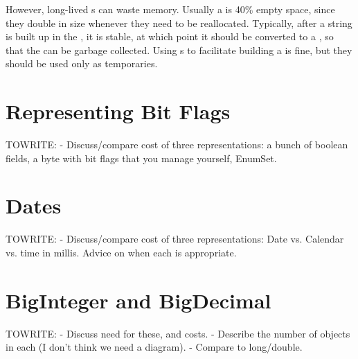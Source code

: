 However, long-lived s can waste memory. Usually a
 is 40\% empty space, since they double in size whenever
they need to be reallocated. Typically, after a string is built up in the
, it is stable, at which point it should be converted 
to a , so that the  can be
garbage collected. Using s to facilitate
building a  is fine, but they should be used only as temporaries.

\section{Representing Bit Flags}
\label{sec:bit-flags}
TOWRITE:
- Discuss/compare cost of three representations: a bunch of boolean fields, a
byte with bit flags that you manage yourself, EnumSet.

\section{Dates}
TOWRITE:
- Discuss/compare cost of three representations: Date vs. Calendar vs. time in
millis.  Advice on when each is appropriate.

\section{BigInteger and BigDecimal}
TOWRITE:
- Discuss need for these, and costs.  - Describe the number of objects in each
(I don't think we need a diagram). - Compare to long/double.
